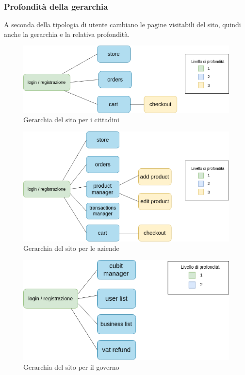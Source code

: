 
\subsubsection{Profondità della gerarchia}
A seconda della tipologia di utente cambiano le pagine visitabili del sito, quindi anche la gerarchia e la relativa profondità.

\begin{figure}[H]
	\includegraphics[scale=0.6]{res/images/RA/profondita0}
	\caption{Gerarchia del sito per i cittadini}
\end{figure}

\begin{figure}[H]
	\includegraphics[scale=0.6]{res/images/RA/profondita1}
	\caption{Gerarchia del sito per le aziende}
\end{figure}

\begin{figure}[H]
	\includegraphics[scale=0.6]{res/images/RA/profondita2}		\caption{Gerarchia del sito per il governo}
\end{figure}


